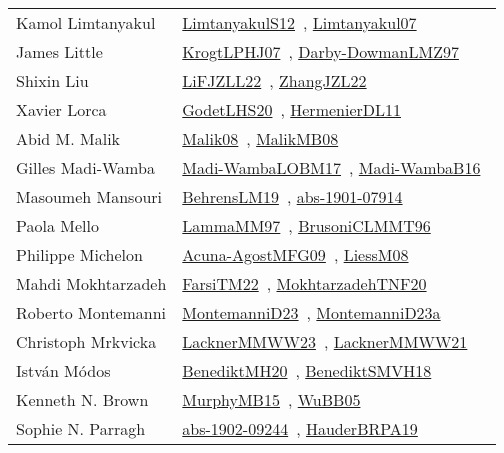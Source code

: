 {\begin{longtable}{p{4cm}p{20cm}}
Kamol Limtanyakul & \href{works/LimtanyakulS12.pdf}{LimtanyakulS12}~\cite{LimtanyakulS12}, \href{works/Limtanyakul07.pdf}{Limtanyakul07}~\cite{Limtanyakul07}\\
James Little & \href{works/KrogtLPHJ07.pdf}{KrogtLPHJ07}~\cite{KrogtLPHJ07}, \href{works/Darby-DowmanLMZ97.pdf}{Darby-DowmanLMZ97}~\cite{Darby-DowmanLMZ97}\\
Shixin Liu & \href{works/LiFJZLL22.pdf}{LiFJZLL22}~\cite{LiFJZLL22}, \href{works/ZhangJZL22.pdf}{ZhangJZL22}~\cite{ZhangJZL22}\\
Xavier Lorca & \href{works/GodetLHS20.pdf}{GodetLHS20}~\cite{GodetLHS20}, \href{works/HermenierDL11.pdf}{HermenierDL11}~\cite{HermenierDL11}\\
Abid M. Malik & \href{}{Malik08}~\cite{Malik08}, \href{}{MalikMB08}~\cite{MalikMB08}\\
Gilles Madi{-}Wamba & \href{works/Madi-WambaLOBM17.pdf}{Madi-WambaLOBM17}~\cite{Madi-WambaLOBM17}, \href{works/Madi-WambaB16.pdf}{Madi-WambaB16}~\cite{Madi-WambaB16}\\
Masoumeh Mansouri & \href{works/BehrensLM19.pdf}{BehrensLM19}~\cite{BehrensLM19}, \href{works/abs-1901-07914.pdf}{abs-1901-07914}~\cite{abs-1901-07914}\\
Paola Mello & \href{works/LammaMM97.pdf}{LammaMM97}~\cite{LammaMM97}, \href{works/BrusoniCLMMT96.pdf}{BrusoniCLMMT96}~\cite{BrusoniCLMMT96}\\
Philippe Michelon & \href{works/Acuna-AgostMFG09.pdf}{Acuna-AgostMFG09}~\cite{Acuna-AgostMFG09}, \href{works/LiessM08.pdf}{LiessM08}~\cite{LiessM08}\\
Mahdi Mokhtarzadeh & \href{}{FarsiTM22}~\cite{FarsiTM22}, \href{}{MokhtarzadehTNF20}~\cite{MokhtarzadehTNF20}\\
Roberto Montemanni & \href{works/MontemanniD23.pdf}{MontemanniD23}~\cite{MontemanniD23}, \href{works/MontemanniD23a.pdf}{MontemanniD23a}~\cite{MontemanniD23a}\\
Christoph Mrkvicka & \href{works/LacknerMMWW23.pdf}{LacknerMMWW23}~\cite{LacknerMMWW23}, \href{works/LacknerMMWW21.pdf}{LacknerMMWW21}~\cite{LacknerMMWW21}\\
Istv{\'{a}}n M{\'{o}}dos & \href{works/BenediktMH20.pdf}{BenediktMH20}~\cite{BenediktMH20}, \href{works/BenediktSMVH18.pdf}{BenediktSMVH18}~\cite{BenediktSMVH18}\\
Kenneth N. Brown & \href{works/MurphyMB15.pdf}{MurphyMB15}~\cite{MurphyMB15}, \href{works/WuBB05.pdf}{WuBB05}~\cite{WuBB05}\\
Sophie N. Parragh & \href{works/abs-1902-09244.pdf}{abs-1902-09244}~\cite{abs-1902-09244}, \href{works/HauderBRPA19.pdf}{HauderBRPA19}~\cite{HauderBRPA19}\\

\end{longtable}}
